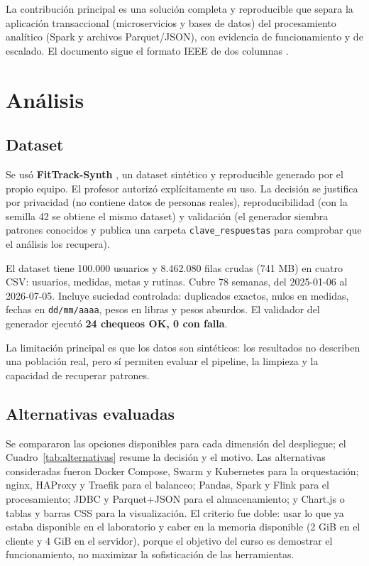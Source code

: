 \documentclass[conference]{IEEEtran}
\begin{document}
La contribución principal es una solución completa y reproducible que separa la aplicación
transaccional (microservicios y bases de datos) del procesamiento analítico (Spark y archivos
Parquet/JSON), con evidencia de funcionamiento y de escalado. El documento sigue el formato IEEE de
dos columnas \cite{ieee}.

\section{Análisis}
\subsection{Dataset}
Se usó \textbf{FitTrack-Synth} \cite{dataset}, un dataset sintético y reproducible generado por el
propio equipo.
El profesor autorizó explícitamente su uso. La decisión se justifica por privacidad (no contiene
datos de personas reales), reproducibilidad (con la semilla 42 se obtiene el mismo dataset) y
validación (el generador siembra patrones conocidos y publica una carpeta \texttt{clave\_respuestas}
para comprobar que el análisis los recupera).

El dataset tiene 100.000 usuarios y 8.462.080 filas crudas (741 MB) en cuatro CSV: usuarios, medidas,
metas y rutinas. Cubre 78 semanas, del 2025-01-06 al 2026-07-05. Incluye suciedad controlada:
duplicados exactos, nulos en medidas, fechas en \texttt{dd/mm/aaaa}, pesos en libras y pesos
absurdos. El validador del generador ejecutó \textbf{24 chequeos OK, 0 con falla}.

La limitación principal es que los datos son sintéticos: los resultados no describen una población
real, pero sí permiten evaluar el pipeline, la limpieza y la capacidad de recuperar patrones.

\subsection{Alternativas evaluadas}
Se compararon las opciones disponibles para cada dimensión del despliegue; el
Cuadro~\ref{tab:alternativas} resume la decisión y el motivo. Las alternativas consideradas fueron
Docker Compose, Swarm y Kubernetes para la orquestación; nginx, HAProxy y Traefik para el balanceo;
Pandas, Spark y Flink para el procesamiento; JDBC y Parquet+JSON para el almacenamiento; y Chart.js o
tablas y barras CSS para la visualización. El criterio fue doble: usar lo que ya
estaba disponible en el laboratorio y caber en la memoria disponible (2 GiB en el cliente y 4 GiB
en el servidor), porque el objetivo del curso es demostrar el funcionamiento, no maximizar la
sofisticación de las herramientas.
\end{document}
